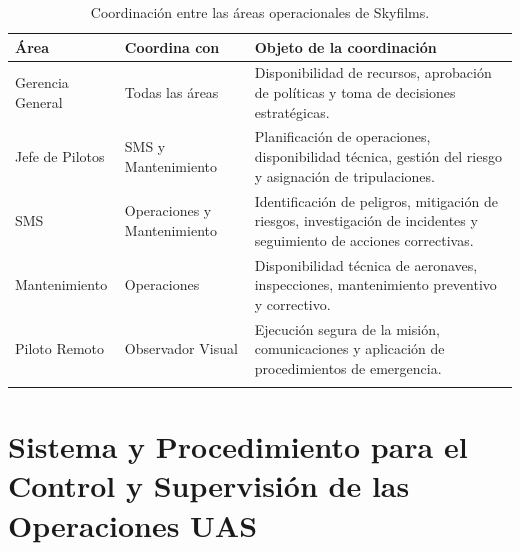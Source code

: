 \renewcommand{\arraystretch}{1.4}

\begin{longtable}{|p{4cm}|p{5cm}|p{6cm}|}

\hline

\textbf{Área} &
\textbf{Coordina con} &
\textbf{Objeto de la coordinación}

\\ \hline

Gerencia General &
Todas las áreas &
Disponibilidad de recursos, aprobación de políticas y toma de decisiones estratégicas.

\\ \hline

Jefe de Pilotos &
SMS y Mantenimiento &
Planificación de operaciones, disponibilidad técnica, gestión del riesgo y asignación de tripulaciones.

\\ \hline

SMS &
Operaciones y Mantenimiento &
Identificación de peligros, mitigación de riesgos, investigación de incidentes y seguimiento de acciones correctivas.

\\ \hline

Mantenimiento &
Operaciones &
Disponibilidad técnica de aeronaves, inspecciones, mantenimiento preventivo y correctivo.

\\ \hline

Piloto Remoto &
Observador Visual &
Ejecución segura de la misión, comunicaciones y aplicación de procedimientos de emergencia.

\\ \hline

\caption{Coordinación entre las áreas operacionales de Skyfilms.}

\end{longtable}



















\section{Sistema y Procedimiento para el Control y Supervisión de las Operaciones UAS}

